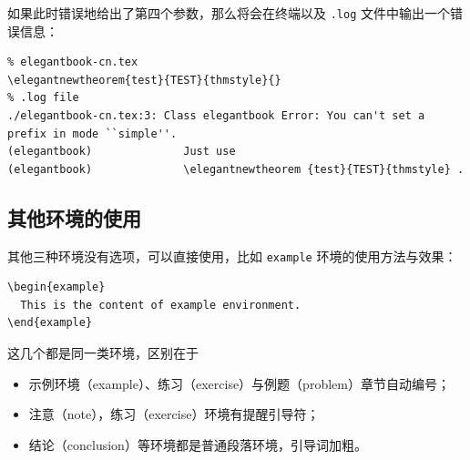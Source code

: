 \documentclass[lang=cn,newtx,10pt,scheme=chinese,pad,twocol]{zznote}
\begin{document}
\begin{itemize}
	      如果此时错误地给出了第四个参数，那么将会在终端以及 \verb|.log| 文件中输出一个错误信息：
	      \begin{lstlisting}
% elegantbook-cn.tex
\elegantnewtheorem{test}{TEST}{thmstyle}{}
% .log file
./elegantbook-cn.tex:3: Class elegantbook Error: You can't set a prefix in mode ``simple''.
(elegantbook)              Just use 
(elegantbook)              \elegantnewtheorem {test}{TEST}{thmstyle} .
\end{lstlisting}

\end{itemize}

\subsection{其他环境的使用}

其他三种环境没有选项，可以直接使用，比如 \lstinline{example} 环境的使用方法与效果：
\begin{lstlisting}
\begin{example}
  This is the content of example environment.
\end{example}
\end{lstlisting}

这几个都是同一类环境，区别在于

\begin{itemize}
	\item 示例环境（example）、练习（exercise）与例题（problem）章节自动编号；
	\item 注意（note），练习（exercise）环境有提醒引导符；
	\item 结论（conclusion）等环境都是普通段落环境，引导词加粗。
\end{itemize}
\end{document}
